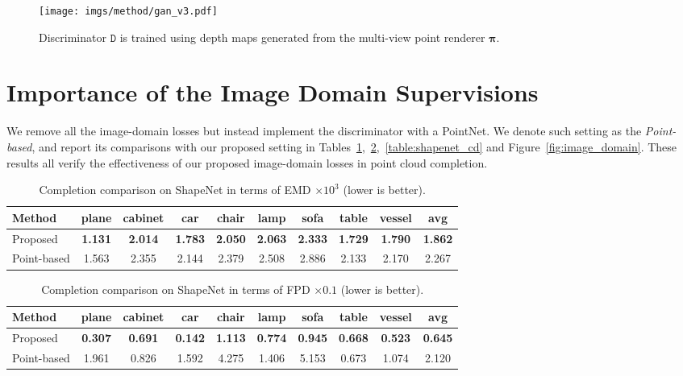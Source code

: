 \documentclass[final]{cvpr}
\begin{document}
\begin{figure}[h]
\centering
 \texttt{[image: imgs/method/gan\_v3.pdf]}
 \footnotesize
    \caption{Discriminator $\mathtt{D}$ is trained using depth maps generated from the multi-view point renderer $\bm{\pi}$.}
\label{fig:gan}
\end{figure}


\section{Importance of the Image Domain Supervisions}
We remove all the image-domain losses but instead implement the discriminator with a PointNet. We denote such setting as the \emph{Point-based}, and report its comparisons with our proposed setting in Tables~\ref{table:shapenet_emd},~\ref{table:shapenet_fpd},~\ref{table:shapenet_cd} and Figure~\ref{fig:image_domain}. These results all verify the effectiveness of our proposed image-domain losses in point cloud completion.  

\begin{table}[h]
\begin{center}
\footnotesize
\setlength\tabcolsep{1.5pt}
\begin{tabular}{@{}l|cccccccc|c@{}}
\toprule
Method&plane&cabinet&car&chair&lamp&sofa&table&vessel&avg\\
\midrule
Proposed & \textbf{1.131} & \textbf{2.014} & \textbf{1.783} & \textbf{2.050} & \textbf{2.063} & \textbf{2.333} & \textbf{1.729} & \textbf{1.790} & \textbf{1.862} \\
Point-based & 1.563 & 2.355 & 2.144 & 2.379 & 2.508 & 2.886 & 2.133 & 2.170 & 2.267 \\

\bottomrule
\end{tabular}
\end{center}
\caption{Completion comparison on ShapeNet in terms of EMD $\times 10^3$ (lower is better).}
\label{table:shapenet_emd}
\end{table}

\begin{table}[h]
\begin{center}
\footnotesize
\setlength\tabcolsep{1.5pt}
\begin{tabular}{@{}l|cccccccc|c@{}}
\toprule
Method&plane&cabinet&car&chair&lamp&sofa&table&vessel&avg\\
\midrule
Proposed & \textbf{0.307} & \textbf{0.691} & \textbf{0.142} & \textbf{1.113} & \textbf{0.774} & \textbf{0.945} & \textbf{0.668} & \textbf{0.523} & \textbf{0.645} \\
Point-based & 1.961 & 0.826 & 1.592 & 4.275 & 1.406 & 5.153 & 0.673 & 1.074 & 2.120 \\
\bottomrule
\end{tabular}
\end{center}
\caption{
Completion comparison on ShapeNet in terms of FPD $\times 0.1$ (lower is better).}
\label{table:shapenet_fpd}
\end{table}
\end{document}
